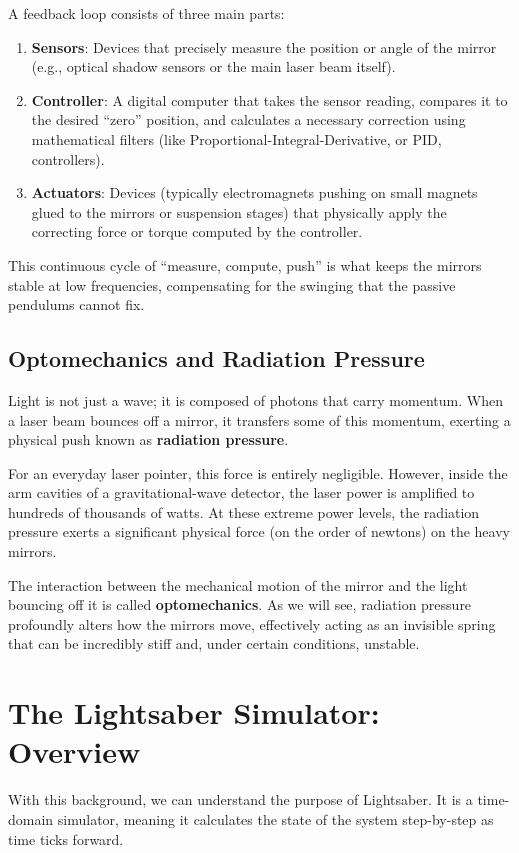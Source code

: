 \documentclass{article}
\begin{document}
A feedback loop consists of three main parts:
\begin{enumerate}
    \item \textbf{Sensors}: Devices that precisely measure the position or angle of the mirror (e.g., optical shadow sensors or the main laser beam itself).
    \item \textbf{Controller}: A digital computer that takes the sensor reading, compares it to the desired ``zero'' position, and calculates a necessary correction using mathematical filters (like Proportional-Integral-Derivative, or PID, controllers).
    \item \textbf{Actuators}: Devices (typically electromagnets pushing on small magnets glued to the mirrors or suspension stages) that physically apply the correcting force or torque computed by the controller.
\end{enumerate}
This continuous cycle of ``measure, compute, push'' is what keeps the mirrors stable at low frequencies, compensating for the swinging that the passive pendulums cannot fix.

\subsection{Optomechanics and Radiation Pressure}
Light is not just a wave; it is composed of photons that carry momentum. When a laser beam bounces off a mirror, it transfers some of this momentum, exerting a physical push known as \textbf{radiation pressure}. 

For an everyday laser pointer, this force is entirely negligible. However, inside the arm cavities of a gravitational-wave detector, the laser power is amplified to hundreds of thousands of watts. At these extreme power levels, the radiation pressure exerts a significant physical force (on the order of newtons) on the heavy mirrors.

The interaction between the mechanical motion of the mirror and the light bouncing off it is called \textbf{optomechanics}. As we will see, radiation pressure profoundly alters how the mirrors move, effectively acting as an invisible spring that can be incredibly stiff and, under certain conditions, unstable.

\section{The Lightsaber Simulator: Overview}
With this background, we can understand the purpose of Lightsaber. It is a time-domain simulator, meaning it calculates the state of the system step-by-step as time ticks forward. 
\end{document}
